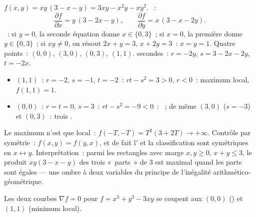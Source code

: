 \begin{example}
\label{ex:b1:multivar:fourpoints}
$f(x, y) = xy\,(3 - x - y) = 3xy - x^2y - xy^2$. ~:
\[
\frac{\partial f}{\partial x} = y\,(3 - 2x - y),
\qquad
\frac{\partial f}{\partial y} = x\,(3 - x - 2y).
\]
~: si $y = 0$, la seconde équation donne $x \in
\{0, 3\}$~; si $x = 0$, la première donne $y \in \{0, 3\}$~; si $xy
\neq 0$, on résout $2x + y = 3$, $x + 2y = 3$~: $x = y = 1$. Quatre
points~: $(0,0)$, $(3,0)$, $(0,3)$, $(1,1)$.  secondes~:
$r = -2y$, $s = 3 - 2x - 2y$, $t = -2x$.
\begin{itemize}
  \item $(1,1)$~: $r = -2$, $s = -1$, $t = -2$~: $rt - s^2 = 3 >
        0$, $r < 0$~: maximum local, $f(1,1) = 1$.
  \item $(0,0)$~: $r = t = 0$, $s = 3$~: $rt - s^2 = -9 < 0$~:
        ~; de même $(3, 0)$ ($s = -3$) et $(0, 3)$~: trois
        .
\end{itemize}
Le maximum n'est que local~: $f(-T, -T) = T^2(3 + 2T) \to
+\infty$. Contrôle par symétrie~: $f(x, y) = f(y, x)$, et de fait
l'  et la classification sont symétriques en $x
\leftrightarrow y$. Interprétation~: parmi les rectangles avec
marge $x, y \geq 0$, $x + y \leq 3$, le produit $xy(3 - x - y)$ des
trois «~parts~» de $3$ est maximal quand les parts sont égales
--- une ombre à deux variables du principe de l'inégalité
arithmético-géométrique.
\end{example}

\begin{omfigure}

{\small Les deux courbes $\nabla f = 0$ pour $f = x^3 + y^3 - 3xy$
se coupent aux  $(0,0)$ () et $(1,1)$
(minimum local).}
\end{omfigure}

